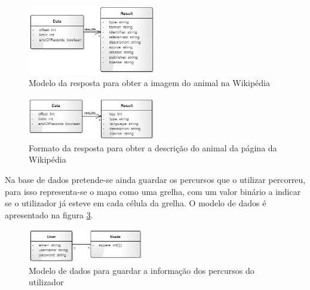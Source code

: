 \documentclass[twocolumn,twoside,11pt,a4paper]{article}
\begin{document}
\begin{figure}[ht!]
	\begin{center}
		\includegraphics[width=0.50\textwidth]{Search_image}
		\caption{Modelo da resposta  para obter a imagem do animal na Wikipédia}
		\label{fig:multimedia}
	\end{center}
\end{figure} 

\begin{figure}[ht!]
	\begin{center}
		\includegraphics[width=0.50\textwidth]{description}
		\caption{Formato da resposta para obter a descrição do animal da página da Wikipédia}
		\label{fig:descricao}
	\end{center}
\end{figure} 

Na base de dados pretende-se ainda guardar os percursos que o utilizar percorreu, para isso representa-se o mapa como uma grelha, com um valor binário a indicar se o utilizador já esteve em cada célula da grelha. O modelo de dados é apresentado na figura  \ref{fig:userdata}.

\begin{figure}[ht!]
	\begin{center}
		\leavevmode
		\includegraphics[width=0.45\textwidth]{userdata}
		\caption{Modelo de dados para guardar a informação dos percursos do utilizador}
		\label{fig:userdata}
	\end{center}
\end{figure} 



\end{document}
